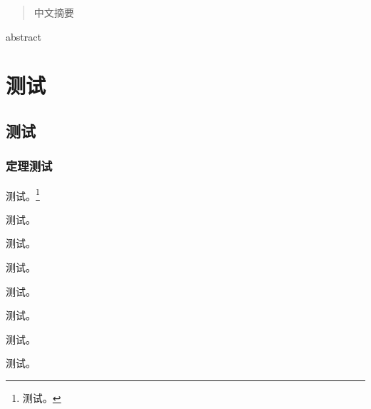 \documentclass{sysuthesis}
\begin{document}
\maketitle
\frontmatter

\begin{abstract}
  中文摘要 \cite{Knuth1984}
\end{abstract}

\begin{abstract*}
  abstract \cite{Knuth1986}
\end{abstract*}

\tableofcontents

\mainmatter

\chapter{测试}
\section{测试}
\subsection{定理测试}

测试。\footnote{测试。}

\begin{lemma}[Fubini] \label{lemma-Fubini}
  测试。
\end{lemma}

\begin{theorem}[Lebesgue] \label{thm-Lebesgue}
  测试。
\end{theorem}

\begin{corollary}[Fourier] \label{cor-Fourier}
  测试。
\end{corollary}

\begin{proposition}[Cantor] \label{prop-Cantor}
  测试。
\end{proposition}

\begin{definition}[Riemann] \label{def-Riemann}
  测试。
\end{definition}

\begin{example}[Gauss] \label{exp-Gauss}
  测试。
\end{example}

\begin{remark}[Kolmogorov] \label{rmk-Kolmogorov}
  测试。
\end{remark}
\end{document}
